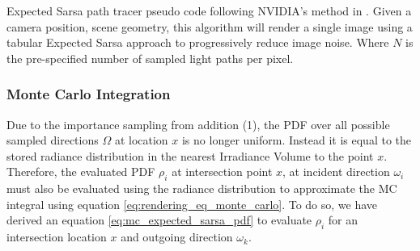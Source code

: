 \documentclass[../dissertation.tex]{subfiles}
\begin{document}
\begin{algorithm}[H]
\label{alg:expected_sarsa_pathtracer}
\SetAlgoLined
 \caption{Expected Sarsa path tracer pseudo code following NVIDIA's method in \cite{dahm2017learning}. Given a camera position, scene geometry, this algorithm will render a single image using a tabular Expected Sarsa approach to progressively reduce image noise. Where $N$ is the pre-specified number of sampled light paths per pixel.}
\end{algorithm}

\subsubsection*{Monte Carlo Integration}

Due to the importance sampling from addition (1), the PDF over all possible sampled directions $\Omega$ at location $x$ is no longer uniform. Instead it is equal to the stored radiance distribution in the nearest Irradiance Volume to the point $x$. Therefore, the evaluated PDF $\rho_i$ at intersection point $x$, at incident direction $\omega_i$ must also be evaluated using the radiance distribution to approximate the MC integral using equation \ref{eq:rendering_eq_monte_carlo}. To do so, we have derived an equation \ref{eq:mc_expected_sarsa_pdf} to evaluate $\rho_i$ for an intersection location $x$ and outgoing direction $\omega_k$.
\end{document}
